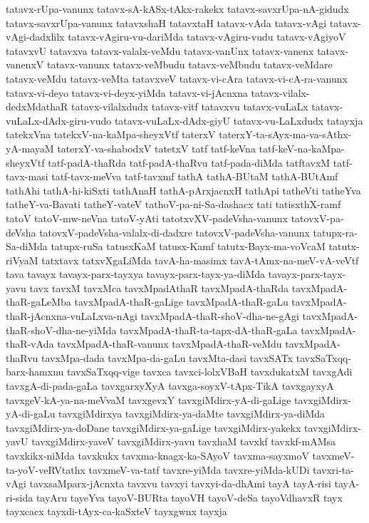 {tatavx-rUpa-vanunx
tatavx-sA-kASx-tAkx-rakekx
tatavx-savxrUpa-nA-gidudx
tatavx-savxrUpa-vanunx
tatavxshaH
tatavxtaH
tatavx-vAda
tatavx-vAgi
tatavx-vAgi-dadxlilx
tatavx-vAgiru-vu-dariMda
tatavx-vAgiru-vudu
tatavx-vAgiyoV
tatavxvU
tatavxva
tatavx-valalx-veMdu
tatavx-vanUnx
tatavx-vanenx
tatavx-vanenxV
tatavx-vanunx
tatavx-veMbudu
tatavx-veMbudu
tatavx-veMdare
tatavx-veMdu
tatavx-veMta
tatavxveV
tatavx-vi-cAra
tatavx-vi-cA-ra-vanunx
tatavx-vi-deyo
tatavx-vi-deyx-yiMda
tatavx-vi-jAcnxna
tatavx-vilalx-dedxMdathaR
tatavx-vilalxdudx
tatavx-vitf
tatavxvu
tatavx-vuLaLx
tatavx-vuLaLx-dAdx-giru-vudo
tatavx-vuLaLx-dAdx-giyU
tatavx-vu-LaLxdudx
tatayxja
tatekxVna
tatekxV-na-kaMpa-sheyxVtf
taterxV
taterxY-ta-sAyx-ma-va-sAthx-yA-mayaM
taterxY-va-shabodxV
tatetxV
tatf
tatf-keVna
tatf-keV-na-kaMpa-sheyxVtf
tatf-padA-thaRda
tatf-padA-thaRvu
tatf-pada-diMda
tatftavxM
tatf-tavx-masi
tatf-tavx-meVva
tatf-tavxmf
tathA
tathA-BUtaM
tathA-BUtAmf
tathAhi
tathA-hi-kiSxti
tathAnaH
tathA-pArxjacnxH
tathApi
tatheVti
tatheYva
tatheY-va-Bavati
tatheY-vateV
tathoV-pa-ni-Sa-dashacx
tati
tatisxthX-ramf
tatoV
tatoV-mw-neVna
tatoV-yAti
tatotxvXV-padeVsha-vanunx
tatovxV-pa-deVsha
tatovxV-padeVsha-valalx-di-dadxre
tatovxV-padeVsha-vanunx
tatupx-ra-Sa-diMda
tatupx-ruSa
tatusxKaM
tatusx-Kamf
tatutx-Bayx-ma-voVcaM
tatutx-riVyaM
tatxtavx
tatxvXgaLiMda
tavA-ha-masimx
tavA-tAmx-na-meV-vA-veVtf
tava
tavayx
tavayx-parx-tayxya
tavayx-parx-tayx-ya-diMda
tavayx-parx-tayx-yavu
tavx
tavxM
tavxMca
tavxMpadAthaR
tavxMpadA-thaRda
tavxMpadA-thaR-gaLeMba
tavxMpadA-thaR-gaLige
tavxMpadA-thaR-gaLu
tavxMpadA-thaR-jAcnxna-vuLaLxva-nAgi
tavxMpadA-thaR-shoV-dha-ne-gAgi
tavxMpadA-thaR-shoV-dha-ne-yiMda
tavxMpadA-thaR-ta-tapx-dA-thaR-gaLa
tavxMpadA-thaR-vAda
tavxMpadA-thaR-vanunx
tavxMpadA-thaR-veMdu
tavxMpadA-thaRvu
tavxMpa-dada
tavxMpa-da-gaLu
tavxMta-dasi
tavxSATx
tavxSaTxqq-barx-hamxnu
tavxSaTxqq-vige
tavxca
tavxci-lolxVBaH
tavxdukatxM
tavxgAdi
tavxgA-di-pada-gaLa
tavxgarxyXyA
tavxga-soyxV-tApx-TikA
tavxgayxyA
tavxgeV-kA-ya-na-meVvaM
tavxgevxY
tavxgiMdirx-yA-di-gaLige
tavxgiMdirx-yA-di-gaLu
tavxgiMdirxya
tavxgiMdirx-ya-daMte
tavxgiMdirx-ya-diMda
tavxgiMdirx-ya-doDane
tavxgiMdirx-ya-gaLige
tavxgiMdirx-yakekx
tavxgiMdirx-yavU
tavxgiMdirx-yaveV
tavxgiMdirx-yavu
tavxhaM
tavxkf
tavxkf-mAMsa
tavxkikx-niMda
tavxkukx
tavxma-knagx-ka-SAyoV
tavxma-sayxmoV
tavxmeV-ta-yoV-veRVtathx
tavxmeV-va-tatf
tavxre-yiMda
tavxre-yiMda-kUDi
tavxri-ta-vAgi
tavxsaMparx-jAcnxta
tavxvu
tavxyi
tavxyi-da-dhAmi
tayA
tayA-risi
tayA-ri-sida
tayAru
tayeYva
tayoV-BURta
tayoVH
tayoV-deSa
tayoVdhavxR
tayx
tayxcacx
tayxdi-tAyx-ca-kaSxteV
tayxgwnx
tayxja
}
